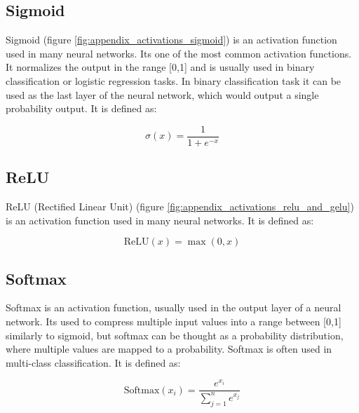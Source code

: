 \subsection*{Sigmoid}

Sigmoid (figure \ref{fig:appendix_activations_sigmoid}) is an activation function used in many neural networks. Its one of the most common activation functions. It normalizes the output in the range [0,1] and is usually used in binary classification or logistic regression tasks. In binary classification task it can be used as the last layer of the neural network, which would output a single probability output. It is defined as:

\begin{equation*}
    \sigma(x) = \frac{1}{1 + e^{-x}}
\end{equation*}









\subsection*{ReLU}

ReLU (Rectified Linear Unit) (figure \ref{fig:appendix_activations_relu_and_gelu}) is an activation function used in many neural networks. It is defined as:

\begin{equation*}
    \text{ReLU}(x) = \max(0, x)
\end{equation*}








\subsection*{Softmax}

Softmax is an activation function, usually used in the output layer of a neural network. Its used to compress multiple input values into a range between [0,1] similarly to sigmoid, but softmax can be thought as a probability distribution, where multiple values are mapped to a probability. Softmax is often used in multi-class classification. It is defined as:

\begin{equation*}
    \text{Softmax}(x_i) = \frac{e^{x_i}}{\sum_{j=1}^{n} e^{x_j}}
\end{equation*}

